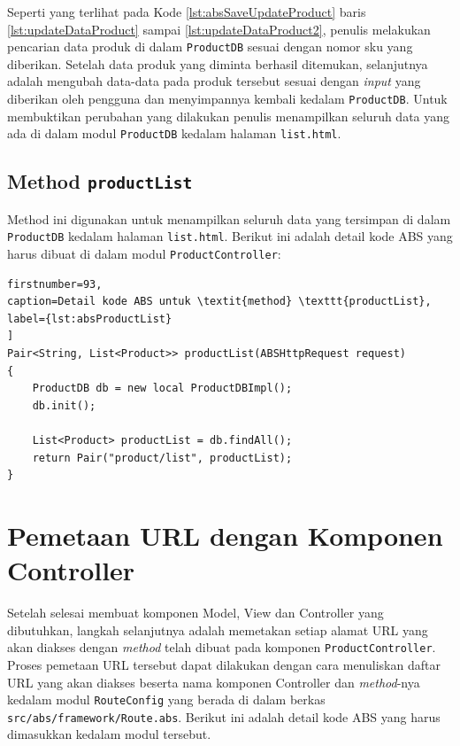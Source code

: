 Seperti yang terlihat pada Kode \ref{lst:absSaveUpdateProduct} baris \ref{lst:updateDataProduct} sampai \ref{lst:updateDataProduct2}, penulis melakukan pencarian data produk di dalam \texttt{ProductDB} sesuai dengan nomor sku yang diberikan. Setelah data produk yang diminta berhasil ditemukan, selanjutnya adalah mengubah data-data pada produk tersebut sesuai dengan \textit{input} yang diberikan oleh pengguna dan menyimpannya kembali kedalam \texttt{ProductDB}. Untuk membuktikan perubahan yang dilakukan penulis menampilkan seluruh data yang ada di dalam modul \texttt{ProductDB} kedalam halaman \texttt{list.html}.

\subsection{Method \texttt{productList}}
Method ini digunakan untuk menampilkan seluruh data yang tersimpan di dalam \texttt{ProductDB} kedalam halaman \texttt{list.html}. Berikut ini adalah detail kode ABS yang harus dibuat di dalam modul \texttt{ProductController}:

\begin{lstlisting}
firstnumber=93,
caption=Detail kode ABS untuk \textit{method} \texttt{productList},
label={lst:absProductList}
]
Pair<String, List<Product>> productList(ABSHttpRequest request)
{
	ProductDB db = new local ProductDBImpl();
	db.init();
	
	List<Product> productList = db.findAll();
	return Pair("product/list", productList);
}
\end{lstlisting}

\section{Pemetaan URL dengan Komponen Controller}

Setelah selesai membuat komponen Model, View dan Controller yang dibutuhkan, langkah selanjutnya adalah memetakan setiap alamat URL yang akan diakses dengan \textit{method} telah dibuat pada komponen \texttt{ProductController}. Proses pemetaan URL tersebut dapat dilakukan dengan cara menuliskan daftar URL yang akan diakses beserta nama komponen Controller dan \textit{method}-nya kedalam modul \texttt{RouteConfig} yang berada di dalam berkas \texttt{src/abs/framework/Route.abs}. Berikut ini adalah detail kode ABS yang harus dimasukkan kedalam modul tersebut.


